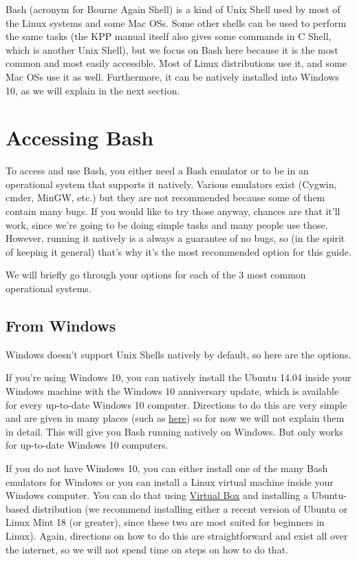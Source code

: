 \documentclass[letterpaper,10pt,openany,oneside]{sphinxmanual}
\begin{document}
Bash (acronym for Bourne Again Shell) is a kind of Unix Shell used by most of
the Linux systems and some Mac OSs. Some other shells can be used to perform
the same tasks (the KPP manual itself also gives some commands in C Shell,
which is another Unix Shell), but we focus on Bash here because it is the most
common and most easily accessible.  Most of Linux distributions use it, and
some Mac OSs use it as well. Furthermore, it can be natively installed into
Windows 10, as we will explain in the next section.


\section{Accessing Bash}
\label{bash:accessing-bash}
To access and use Bash, you either need a Bash emulator or to be in an
operational system that supports it natively. Various emulators exist (Cygwin,
cmder, MinGW, etc.) but they are not recommended because some of them contain
many bugs. If you would like to try those anyway, chances are that it'll work,
since we're going to be doing simple tasks and many people use those. However,
running it natively is a always a guarantee of no bugs, so (in the spirit of
keeping it general) that's why it's the most recommended option for this guide.

We will briefly go through your options for each of the 3 most common
operational systems.


\subsection{From Windows}
\label{bash:from-windows}
Windows doesn't support Unix Shells natively by default, so here are the
options.

If you're using Windows 10, you can natively install the Ubuntu 14.04 inside
your Windows machine with the Windows 10 anniversary update, which is available
for every up-to-date Windows 10 computer. Directions to do this are very simple
and are given in many places (such as \href{http://www.howtogeek.com/249966/how-to-install-and-use-the-linux-bash-shell-on-windows-10/}{here})
so for now we will not explain them in detail. This will give you Bash running
natively on Windows. But only works for up-to-date Windows 10 computers.

If you do not have Windows 10, you can either install one of the many Bash
emulators for Windows or you can install a Linux virtual machine inside your
Windows computer.  You can do that using \href{https://www.virtualbox.org/wiki/Downloads}{Virtual Box} and installing a Ubuntu-based
distribution (we recommend installing either a recent version of Ubuntu or
Linux Mint 18 (or greater), since these two are most suited for beginners in
Linux). Again, directions on how to do this are straightforward and exist all
over the internet, so we will not spend time on steps on how to do that.
\end{document}
